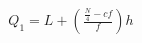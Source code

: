 \documentclass[preview]{standalone}
\begin{document}
\begin{align*}
Q_1=L+\left(\frac{\frac{N}{4}-cf}{f}\right)h
\end{align*}
\end{document}
